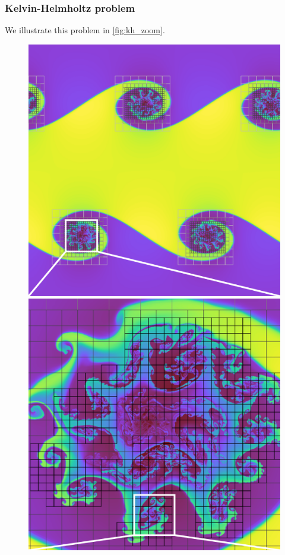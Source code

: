 \documentclass[fleqn,usenatbib]{mnras}
\begin{document}
\subsubsection{Kelvin-Helmholtz problem}
We illustrate this problem in \autoref{fig:kh_zoom}.
\begin{figure}
    \includegraphics[width=0.9\columnwidth]{quokka_full.pdf}
    \includegraphics[width=0.9\columnwidth]{quokka_zoom.pdf}

\end{figure}
\end{document}
